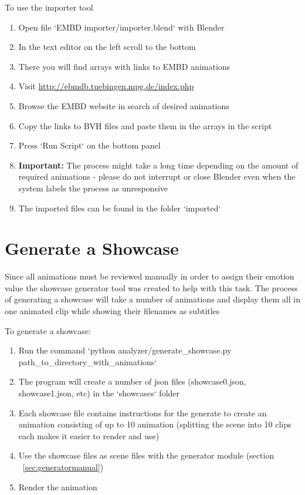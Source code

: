 \noindent To use the importer tool
\begin{enumerate}
	\item Open file `EMBD importer/importer.blend` with Blender
	\item In the text editor on the left scroll to the bottom
	\item There you will find arrays with links to EMBD animations
	\item Visit \url{http://ebmdb.tuebingen.mpg.de/index.php}
	\item Browse the EMBD website in search of desired animations
	\item Copy the links to BVH files and paste them in the arrays in the script
	\item Press `Run Script` on the bottom panel
	\item \textbf{Important:} The process might take a long time depending on the amount of required animations - please do not interrupt or close Blender even when the system labels the process as unresponsive
	\item The imported files can be found in the folder `imported`
\end{enumerate}


\section{Generate a Showcase \label{sec:showcasegeneratormanual}}
Since all animations must be reviewed manually in order to assign their emotion value the showcase generator tool was created to help with this task. The process of generating a showcase will take a number of animations and display them all in one animated clip while showing their filenames as subtitles

\noindent To generate a showcase:
\begin{enumerate}
	\item Run the command `python analyzer/generate\_showcase.py path\_to\_directory\_with\_animations`
	\item The program will create a number of json files (showcase0.json, showcase1.json, etc) in the `showcases` folder
	\item Each showcase file contains instructions for the generate to create an animation consisting of up to 10 animation (splitting the scene into 10 clips each makes it easier to render and use)
	\item Use the showcase files as scene files with the generator module (section ~\ref{sec:generatormanual})
	\item Render the animation
\end{enumerate}


